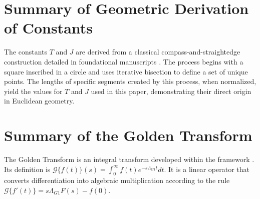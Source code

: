 \documentclass{article}
\theoremstyle{plain}
\theoremstyle{definition}
\theoremstyle{remark}
\begin{document}
\appendix
\section{Summary of Geometric Derivation of Constants}
The constants $T$ and $J$ are derived from a classical compass-and-straightedge construction detailed in foundational manuscripts \cite{HarrManuscripts}. The process begins with a square inscribed in a circle and uses iterative bisection to define a set of unique points. The lengths of specific segments created by this process, when normalized, yield the values for $T$ and $J$ used in this paper, demonstrating their direct origin in Euclidean geometry.

\section{Summary of the Golden Transform}
The Golden Transform is an integral transform developed within the framework \cite{HarrCompendium}. Its definition is $\mathcal{G}\{f(t)\}(s) = \int_0^\infty f(t) e^{-s\Lambda_{G1} t} dt$. It is a linear operator that converts differentiation into algebraic multiplication according to the rule $\mathcal{G}\{f'(t)\} = s\Lambda_{G1} F(s) - f(0)$.

\printbibliography
\end{document}
